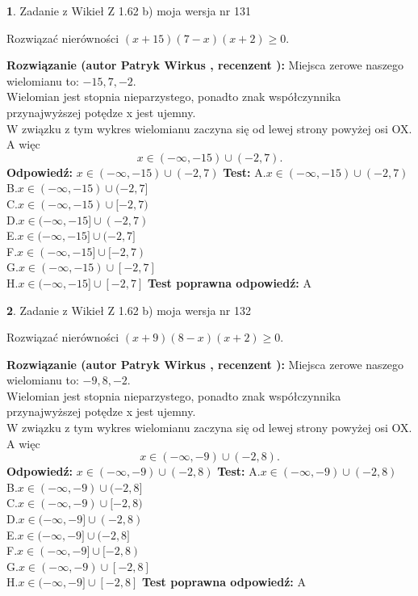 \documentclass[12pt, a4paper]{article}
\theoremstyle{definition} %
\newtheorem{zad}{}
\newcommand{\zadStart}[1]{\begin{zad}#1\newline}
\newcommand{\zadStop}{\end{zad}}
\newcommand{\rozwStart}[2]{\noindent \textbf{Rozwiązanie (autor #1 , recenzent #2): }\newline}
\newcommand{\rozwStop}{\newline}
\newcommand{\odpStart}{\noindent \textbf{Odpowiedź:}\newline}
\newcommand{\odpStop}{\newline}
\newcommand{\testStart}{\noindent \textbf{Test:}\newline}
\newcommand{\testStop}{\newline}
\newcommand{\kluczStart}{\noindent \textbf{Test poprawna odpowiedź:}\newline}
\newcommand{\kluczStop}{\newline}
\begin{document}
\zadStart{Zadanie z Wikieł Z 1.62 b) moja wersja nr 131}

Rozwiązać nierówności $(x+15)(7-x)(x+2)\ge0$.
\zadStop
\rozwStart{Patryk Wirkus}{}
Miejsca zerowe naszego wielomianu to: $-15, 7, -2$.\\
Wielomian jest stopnia nieparzystego, ponadto znak współczynnika przy\linebreak najwyższej potędze x jest ujemny.\\ W związku z tym wykres wielomianu zaczyna się od lewej strony powyżej osi OX. A więc $$x \in (-\infty,-15) \cup (-2,7).$$
\rozwStop
\odpStart
$x \in (-\infty,-15) \cup (-2,7)$
\odpStop
\testStart
A.$x \in (-\infty,-15) \cup (-2,7)$\\
B.$x \in (-\infty,-15) \cup (-2,7]$\\
C.$x \in (-\infty,-15) \cup [-2,7)$\\
D.$x \in (-\infty,-15] \cup (-2,7)$\\
E.$x \in (-\infty,-15] \cup (-2,7]$\\
F.$x \in (-\infty,-15] \cup [-2,7)$\\
G.$x \in (-\infty,-15) \cup [-2,7]$\\
H.$x \in (-\infty,-15] \cup [-2,7]$
\testStop
\kluczStart
A
\kluczStop



\zadStart{Zadanie z Wikieł Z 1.62 b) moja wersja nr 132}

Rozwiązać nierówności $(x+9)(8-x)(x+2)\ge0$.
\zadStop
\rozwStart{Patryk Wirkus}{}
Miejsca zerowe naszego wielomianu to: $-9, 8, -2$.\\
Wielomian jest stopnia nieparzystego, ponadto znak współczynnika przy\linebreak najwyższej potędze x jest ujemny.\\ W związku z tym wykres wielomianu zaczyna się od lewej strony powyżej osi OX. A więc $$x \in (-\infty,-9) \cup (-2,8).$$
\rozwStop
\odpStart
$x \in (-\infty,-9) \cup (-2,8)$
\odpStop
\testStart
A.$x \in (-\infty,-9) \cup (-2,8)$\\
B.$x \in (-\infty,-9) \cup (-2,8]$\\
C.$x \in (-\infty,-9) \cup [-2,8)$\\
D.$x \in (-\infty,-9] \cup (-2,8)$\\
E.$x \in (-\infty,-9] \cup (-2,8]$\\
F.$x \in (-\infty,-9] \cup [-2,8)$\\
G.$x \in (-\infty,-9) \cup [-2,8]$\\
H.$x \in (-\infty,-9] \cup [-2,8]$
\testStop
\kluczStart
A
\kluczStop
\end{document}

